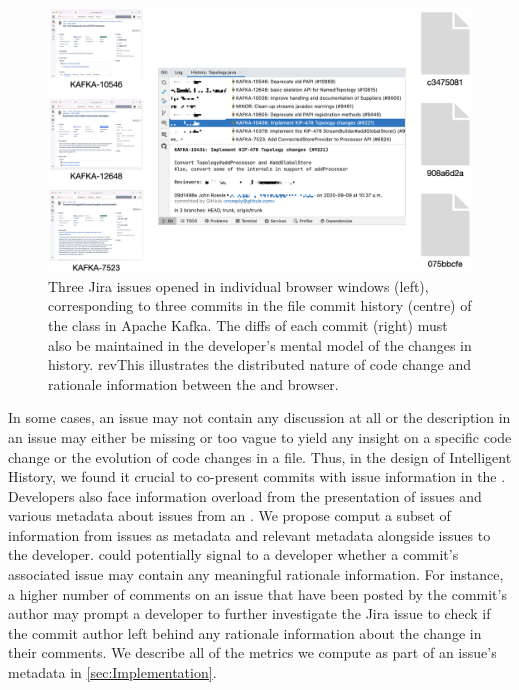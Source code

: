 \begin{figure}
    \center
    \includegraphics[width=\textwidth]{./images/cognitive-load.png}
    \caption{
        Three Jira issues opened in individual browser windows (left), corresponding to three commits in the file commit history (centre) of the  class in Apache Kafka. 
        The diffs of each commit (right) must also be maintained in the developer's mental model of the changes in history. 
        rev{This} illustrates the distributed nature of code change and rationale information between the  and browser.
    }
    \label{fig:Cognitive-Load}
\end{figure}

In some cases, an issue may not contain any discussion at all or the description in an issue may either be missing 
or too vague to yield any insight on a specific code change or the evolution of code changes in a file.
Thus, in the design of Intelligent History, we found it crucial to co-present commits with issue information in the .
Developers also face information overload from the presentation of issues and 
various metadata about issues from an  \cite{baysal_issue-overload_2014,bertram_social-nature_2010}.
We propose comput a subset of information from issues as metadata and  relevant metadata
alongside issues to the developer.
 could potentially signal to a developer whether a commit's associated issue
may contain any meaningful rationale information. 
For instance, a higher number of comments on an issue that have been
posted by the commit's author may prompt a developer to further investigate the Jira issue to check if the
commit author left behind any rationale information about the change in their comments.
We describe all of the metrics we compute as part of an issue's metadata in \autoref{sec:Implementation}.

